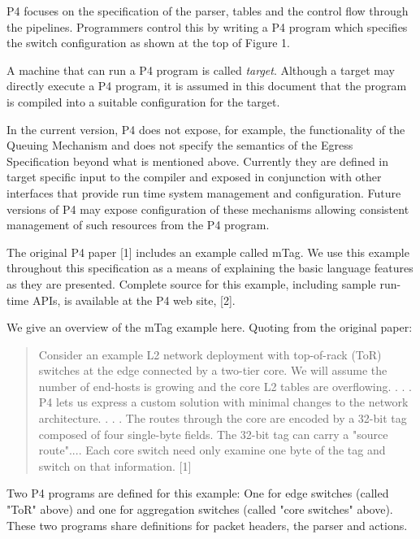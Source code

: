 \documentclass[12pt]{article}
\begin{document}
P4 focuses on the specification of the parser, \matchaction tables and the 
control flow through the pipelines. Programmers control this by writing a 
P4 program which specifies the switch configuration as shown at the top of 
Figure 1. 

A machine that can run a P4 program is called \textit{target}. Although a target 
may directly execute a P4 program, it is assumed in this document that the 
program is compiled into a suitable configuration for the target.

In the current version, P4 does not expose, for example, the functionality 
of the Queuing Mechanism and does not specify the semantics of the Egress 
Specification beyond what is mentioned above. Currently they are defined in 
target specific input to the compiler and exposed in conjunction with other 
interfaces that provide run time system management and configuration. Future 
versions of P4 may expose configuration of these mechanisms allowing consistent 
management of such resources from the P4 program.


The original P4 paper [1] includes an example called mTag. We use this example 
throughout this specification as a means of explaining the basic language 
features as they are presented. Complete source for this example, including 
sample run-time APIs, is available at the P4 web site, [2].

We give an overview of the mTag example here.  Quoting from the original paper:

\begin{quote}
Consider an example L2 network deployment with top-of-rack (ToR) switches 
at the edge connected by a two-tier core. We will assume the number of end-hosts 
is growing and the core L2 tables are overflowing. . . .  P4 lets us express a 
custom solution with minimal changes to the network architecture. . . . The routes 
through the core are encoded by a 32-bit tag composed of four single-byte 
fields.  The 32-bit tag can carry a "source route".... Each core switch need 
only examine one byte of the tag and switch on that information. [1]
\end{quote}

Two P4 programs are defined for this example: One for edge switches (called 
"ToR" above) and one for aggregation switches (called "core switches" above). 
These two programs share definitions for packet headers, the parser and actions.

\end{document}
